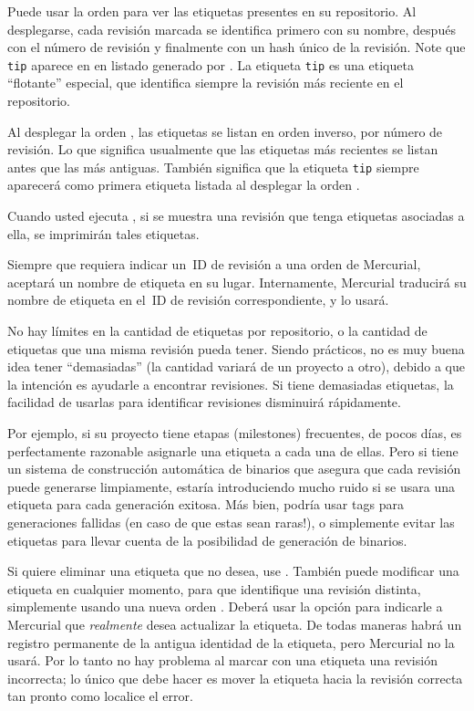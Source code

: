 Puede usar la orden  para ver las etiquetas presentes en
su repositorio. Al desplegarse, cada revisión marcada se identifica
primero con su nombre, después con el número de revisión y finalmente con
un hash único de la revisión.
Note que \texttt{tip} aparece en en listado generado por . La etiqueta
\texttt{tip} es una etiqueta ``flotante'' especial, que identifica siempre
la revisión más reciente en el repositorio.

Al desplegar la orden , las etiquetas se listan en orden
inverso, por número de revisión. Lo que significa usualmente que las
etiquetas más recientes se listan antes que las más antiguas. También
significa que la etiqueta \texttt{tip} siempre aparecerá como primera
etiqueta listada al desplegar la orden .

Cuando usted ejecuta , si se muestra una revisión que tenga 
etiquetas asociadas a ella, se imprimirán tales etiquetas.

Siempre que requiera indicar un~ID de revisión a una orden de
Mercurial, aceptará un nombre de etiqueta en su lugar.  Internamente,
Mercurial traducirá su nombre de etiqueta en el~ID de revisión
correspondiente, y lo usará.

No hay límites en la cantidad de etiquetas por repositorio, o la cantidad
de etiquetas que una misma revisión pueda tener. Siendo prácticos, no es
muy buena idea tener ``demasiadas'' (la cantidad variará de un
proyecto a otro), debido a que la intención es ayudarle a encontrar
revisiones. Si tiene demasiadas etiquetas, la facilidad de usarlas
para identificar revisiones disminuirá rápidamente.

Por ejemplo, si su proyecto tiene etapas (milestones) frecuentes, de pocos
días, es perfectamente razonable asignarle una etiqueta a cada una de
ellas. Pero si tiene un sistema de construcción automática de binarios
que asegura que cada revisión puede generarse limpiamente, estaría
introduciendo mucho ruido si se usara una etiqueta para cada generación
exitosa. Más bien, podría usar tags para generaciones fallidas
(\textexclamdown en
caso de que estas sean raras!), o simplemente evitar las etiquetas para
llevar cuenta de la posibilidad de generación de binarios.


Si quiere eliminar una etiqueta que no desea, use
.  
También puede modificar una etiqueta en cualquier momento, para que
identifique una revisión distinta, simplemente usando una nueva orden
. Deberá usar la opción  para indicarle a
Mercurial que \emph{realmente} desea actualizar la etiqueta.
De todas maneras habrá un registro permanente de la antigua identidad
de la etiqueta, pero Mercurial no la usará. Por lo tanto no hay
problema al marcar con una etiqueta una revisión incorrecta; lo único
que debe hacer es mover la etiqueta hacia la revisión correcta tan
pronto como localice el error.

